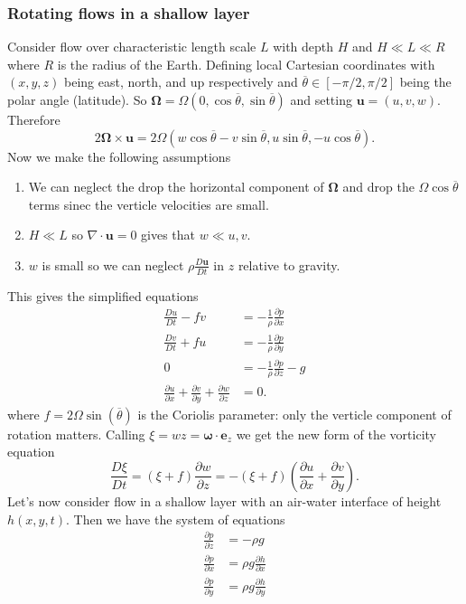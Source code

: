 \documentclass{article}
\begin{document}
\subsubsection{Rotating flows in a shallow layer}
Consider flow over characteristic length scale $ L $ with depth $ H $ and $ H\ll L \ll R $ where $ R $ is the radius of the Earth. Defining local Cartesian coordinates with $ (x,y,z) $ being east, north, and up respectively and $ \overline \theta \in [-\pi/2, \pi/2] $ being the polar angle (latitude). So $ \boldsymbol\Omega = \Omega(0,\cos\overline \theta, \sin\overline \theta) $ and setting $ \mathbf u = (u,v,w) $. Therefore
\[
  2\boldsymbol\Omega \times\mathbf u = 2\Omega(w\cos\overline\theta - v\sin\overline\theta, u\sin\overline \theta, -u\cos\overline\theta).
\]
Now we make the following assumptions
\begin{enumerate}
	\item We can neglect the drop the horizontal component of $ \boldsymbol\Omega $ and drop the $ \Omega \cos\overline \theta $ terms sinec the verticle velocities are small.
	\item $ H\ll L $ so $ \nabla\cdot\mathbf u =0  $ gives that $ w \ll u,v $.
	\item $ w $ is small so we can neglect $ \rho \frac{D\mathbf u}{Dt} $ in $ z $ relative to gravity.
\end{enumerate}
This gives the simplified equations
\begin{align*}
	\frac{Du}{Dt} - fv &= - \frac 1\rho \frac{\partial p}{\partial x} \\
		\frac{Dv}{Dt} + fu &= -\frac 1 \rho \frac{\partial p}{\partial y} \\
		0 &= -\frac 1\rho \frac{\partial p}{\partial z} - g \\
		\frac{\partial u}{\partial x} + \frac{\partial v}{\partial y} + \frac{\partial w}{\partial z} &= 0.
\end{align*}
where $ f= 2\Omega \sin(\overline \theta) $ is the Coriolis parameter: only the verticle component of rotation matters.
Calling $ \xi = wz = \boldsymbol \omega \cdot \mathbf e_z $ we get the new form of the vorticity equation
\[
	\frac{D\xi}{Dt} = (\xi+f)\frac{\partial w}{\partial z} = -(\xi+f)\left(\frac{\partial u}{\partial x} + \frac{\partial v}{\partial y}\right).
\]
Let's now consider flow in a shallow layer with an air-water interface of height $ h(x,y,t) $. Then we have the system of equations
\begin{align*}
	\frac{\partial p}{\partial z} &= - \rho g \\
	\frac{\partial p}{\partial x} &= \rho g \frac{\partial h}{\partial x} \\
	\frac{\partial p}{\partial y} &= \rho g \frac{\partial h}{\partial y}
\end{align*}
\end{document}
